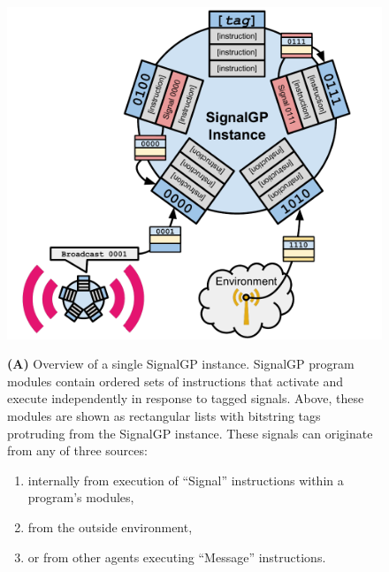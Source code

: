 \begin{figure}
\begin{center}
\begin{minipage}[t]{0.5\linewidth}

\begin{minipage}[t]{\linewidth}
\centering
\vspace{0pt} %
\begin{minipage}{\textwidth}
\includegraphics[width=\linewidth]{img/signalgp-cartoon}
{\textbf{(A)}
Overview of a single SignalGP instance.
SignalGP program modules contain ordered sets of instructions that activate and execute independently in response to tagged signals.
Above, these modules are shown as rectangular lists with bitstring tags protruding from the SignalGP instance.
These signals can originate from any of three sources:
\begin{enumerate}
  \item internally from execution of ``Signal'' instructions within a program's modules,
  \item from the outside environment,
  \item or from other agents executing ``Message'' instructions.
\end{enumerate}
}
\end{minipage}
\end{minipage}%


\end{minipage}
\end{center}
\end{figure}
